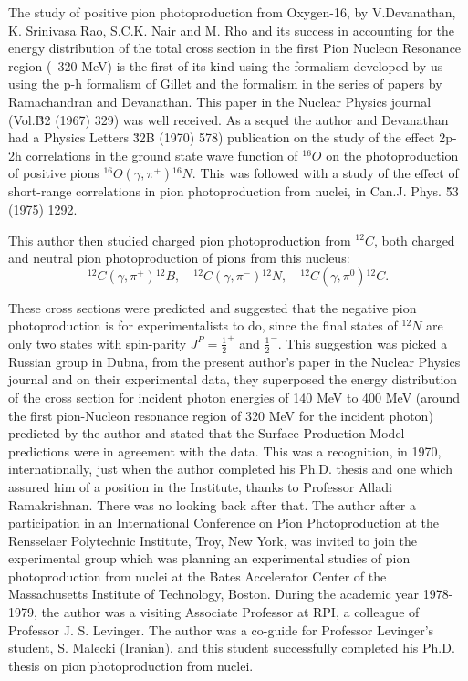 The study of positive pion photoproduction from Oxygen-16, by V.Devanathan, 
K. Srinivasa Rao, S.C.K. Nair and M. Rho and its success in accounting for the 
energy distribution of the total cross section in the first Pion Nucleon Resonance 
region (~320 MeV) is the first of its kind using the formalism developed by us using 
the p-h formalism of Gillet and the formalism in the series of papers by Ramachandran 
and Devanathan. This paper in the Nuclear Physics journal (Vol.\u{B2} (1967) 329) was 
well received. As a sequel the author and Devanathan had a Physics Letters \u{32B} 
(1970) 578) publication on the study of the effect 2p-2h correlations in the ground 
state wave function of $^{16}O$ on the photoproduction of positive pions  
$^{16}O(\gamma, \pi^+){}^{16}N$. This was followed with a study of the effect of 
short-range correlations in pion photoproduction from nuclei, in Can.J. Phys. 
\u{53} (1975) 1292.

This author then studied charged pion photoproduction from $^{12}C$, both charged 
and neutral pion photoproduction of pions from this nucleus:
$$
{}^{12}C(\gamma, \pi^+){}^{12}B, \quad  {}^{12}C(\gamma, \pi^-){}^{12}N, \quad 
{}^{12}C(\gamma, \pi^0){}^{12}C.
$$

These cross sections were predicted and suggested that the negative pion 
photoproduction is for experimentalists to do, since the final states of ${}^{12}N$ 
are only two states with spin-parity $J^P=\frac{1}{2}^+$ and $\frac{1}{2}^-$.
This suggestion was picked a Russian group in Dubna, from the present author's paper
in the Nuclear Physics journal and on their experimental data, they superposed the 
energy distribution of the cross section for incident photon energies of 140 MeV
to 400 MeV (around the first pion-Nucleon resonance region of 320 MeV for the incident
photon) predicted by the author and stated that the Surface Production Model 
predictions were in agreement with the data. This was a recognition, in 1970,
internationally, just when the author completed his Ph.D. thesis and one which assured 
him of a position in the Institute, thanks to Professor Alladi Ramakrishnan. 
There was no looking back after that. The author after a participation in an 
International Conference on Pion Photoproduction at the Rensselaer Polytechnic Institute, 
Troy, New York, was invited to join the experimental group which was planning an 
experimental studies of pion photoproduction from nuclei at the Bates Accelerator 
Center of the Massachusetts Institute of Technology, Boston. During the academic 
year 1978-1979, the author was a visiting Associate Professor at RPI, a colleague 
of Professor J. S. Levinger. The author was a co-guide for Professor Levinger's 
student, S. Malecki (Iranian), and this student successfully completed his Ph.D. 
thesis on pion photoproduction from nuclei.

